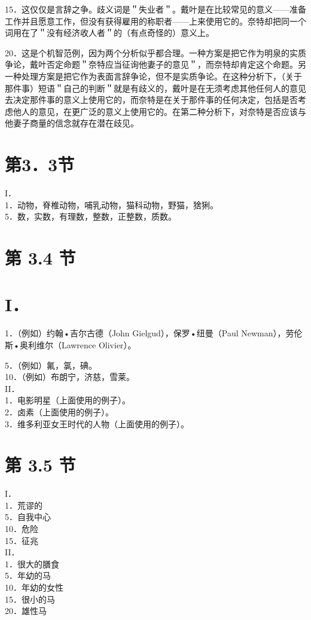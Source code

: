 15．这仅仅是言辞之争。歧义词是＂失业者＂。戴叶是在比较常见的意义——准备工作并且愿意工作，但没有获得雇用的称职者——上来使用它的。奈特却把同一个词用在了＂没有经济收人者＂的（有点奇怪的）意义上。

20．这是个机智范例，因为两个分析似乎都合理。一种方案是把它作为明泉的实质争论，戴叶否定命题＂奈特应当征询他妻子的意见＂，而奈特却肯定这个命题。另一种处理方案是把它作为表面言辞争论，但不是实质争论。在这种分析下，（关于那件事）短语＂自己的判断＂就是有歧义的，戴叶是在无须考虑其他任何人的意见去决定那件事的意义上使用它的，而奈特是在关于那件事的任何决定，包括是否考虑他人的意见，在更广泛的意义上使用它的。在第二种分析下，对奈特是否应该与他妻子商量的信念就存在潜在歧见。

\section*{第3．3节}
I．\\
1．动物，脊椎动物，哺乳动物，猫科动物，野猫，猞猁。\\
5．数，实数，有理数，整数，正整数，质数。

\section*{第 3.4 节}
\section*{I．}
1．（例如）约翰•吉尔古德（John Gielgud），保罗•纽曼（Paul Newman），劳伦斯•奥利维尔（Lawrence Olivier）。

5．（例如）氟，氯，碘。\\
10．（例如）布朗宁，济慈，雪莱。\\
II．\\
1．电影明星（上面使用的例子）。\\
2．卤素（上面使用的例子）。\\
3．维多利亚女王时代的人物（上面使用的例子）。

\section*{第 3.5 节}
I．\\
1．荒谬的\\
5．自我中心\\
10．危险\\
15．征兆\\
II．\\
1．很大的膳食\\
5．年幼的马\\
10．年幼的女性\\
15．很小的马\\
20．雄性马

